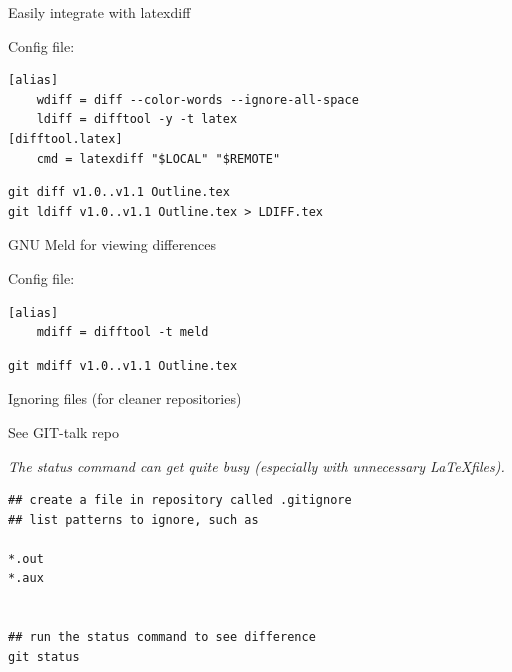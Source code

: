 \begin{frame}[fragile]{Easily integrate with latexdiff}

Config file:
\begin{verbatim}
[alias]
    wdiff = diff --color-words --ignore-all-space
    ldiff = difftool -y -t latex
[difftool.latex]
    cmd = latexdiff "$LOCAL" "$REMOTE"
\end{verbatim}
  
\begin{verbatim}
git diff v1.0..v1.1 Outline.tex
git ldiff v1.0..v1.1 Outline.tex > LDIFF.tex
\end{verbatim}

\end{frame}


\begin{frame}[fragile]{GNU Meld for viewing differences}

Config file:
\begin{verbatim}
[alias]
    mdiff = difftool -t meld
\end{verbatim}
  
\begin{verbatim}
git mdiff v1.0..v1.1 Outline.tex
\end{verbatim}

\end{frame}



\begin{frame}[fragile]{Ignoring files (for cleaner repositories)}
  
  See GIT-talk repo

  \itshape\color{gray}
  The status command can get quite busy (especially with unnecessary
  \LaTeX files).
\begin{verbatim}
## create a file in repository called .gitignore
## list patterns to ignore, such as

*.out
*.aux


## run the status command to see difference
git status
\end{verbatim}


\end{frame}



